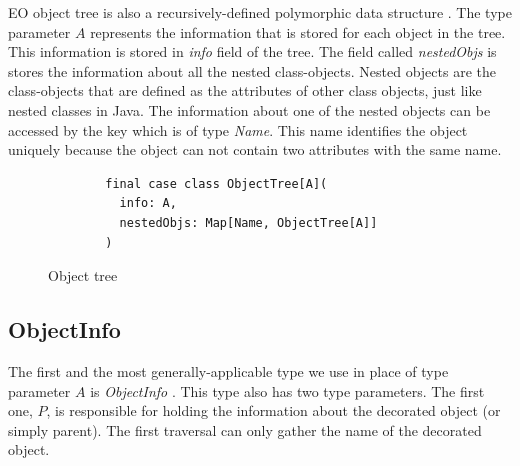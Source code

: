 EO object tree is also a recursively-defined polymorphic data structure . The type parameter $A$ represents the information that is stored for each object in the tree. This information is stored in \textit{info} field of the tree. The field called \textit{nestedObjs} is stores the information about all the nested class-objects. Nested objects are the class-objects that are defined as the attributes of other class objects, just like nested classes in Java. The information about one of the nested objects can be accessed by the key which is of type \textit{Name}. This name identifies the object uniquely because the object can not contain two attributes with the same name.  

\begin{figure}
    \begin{lstlisting}
        final case class ObjectTree[A](
          info: A,
          nestedObjs: Map[Name, ObjectTree[A]]
        ) 
    \end{lstlisting}
    \caption{Object tree}
    \label{fig:objtree}
\end{figure}

\subsection{ObjectInfo}

The first and the most generally-applicable type we use in place of type parameter $A$  is \textit{ObjectInfo} . This type also has two type parameters. The first one, $P$, is responsible for holding the information about the decorated object (or simply parent). The first traversal can only gather the name of the decorated object. 

